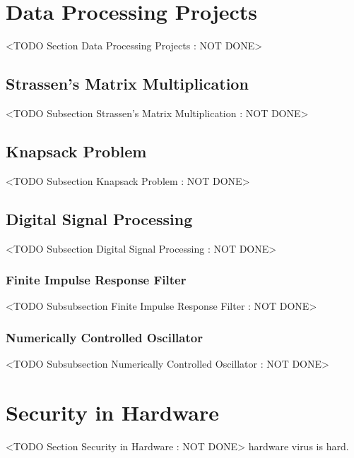 \section{Data Processing Projects}
	<TODO Section Data Processing Projects : NOT DONE>

\subsection{Strassen's Matrix Multiplication}
	<TODO Subsection Strassen's Matrix Multiplication : NOT DONE>

\subsection{Knapsack Problem}
	<TODO Subsection Knapsack Problem : NOT DONE>

\subsection{Digital Signal Processing}
	<TODO Subsection Digital Signal Processing : NOT DONE>

\subsubsection{Finite Impulse Response Filter}
	<TODO Subsubsection  Finite Impulse Response Filter : NOT DONE>

\subsubsection{Numerically Controlled Oscillator}
	<TODO Subsubsection  Numerically Controlled Oscillator : NOT DONE>

\section{Security in Hardware}
	<TODO Section Security in Hardware : NOT DONE>
hardware virus is hard. 
